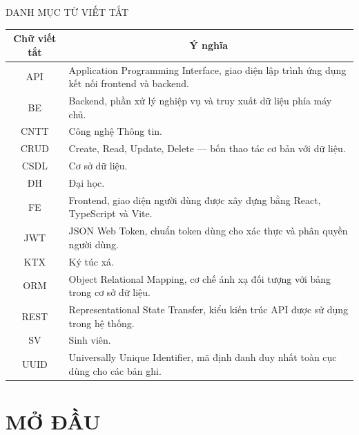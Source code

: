 \documentclass[12pt]{article}
\begin{document}
	\clearpage
	\listoffigures
	\clearpage
	\listoftables
	
	
	\newpage
	\begin{center}
		\fontsize{14pt}{17pt}\selectfont
		{DANH MỤC TỪ VIẾT TẮT}
	\end{center}
	
	\vspace{10pt}
	
	\begin{tabular}{|c|p{11cm}|}
        \hline
        {Chữ viết tắt} & \multicolumn{1}{c|}{\textbf{Ý nghĩa}} \\
        \hline
        API  & Application Programming Interface, giao diện lập trình ứng dụng kết nối frontend và backend. \\
        \hline
        BE   & Backend, phần xử lý nghiệp vụ và truy xuất dữ liệu phía máy chủ. \\
        \hline
        CNTT & Công nghệ Thông tin. \\
        \hline
        CRUD & Create, Read, Update, Delete — bốn thao tác cơ bản với dữ liệu. \\
        \hline
        CSDL & Cơ sở dữ liệu. \\
        \hline
        ĐH   & Đại học. \\
        \hline
        FE   & Frontend, giao diện người dùng được xây dựng bằng React, TypeScript và Vite. \\
        \hline
        JWT  & JSON Web Token, chuẩn token dùng cho xác thực và phân quyền người dùng. \\
        \hline
        KTX  & Ký túc xá. \\
        \hline
        ORM  & Object Relational Mapping, cơ chế ánh xạ đối tượng với bảng trong cơ sở dữ liệu. \\
        \hline
        REST & Representational State Transfer, kiểu kiến trúc API được sử dụng trong hệ thống. \\
        \hline
        SV   & Sinh viên. \\
        \hline
        UUID & Universally Unique Identifier, mã định danh duy nhất toàn cục dùng cho các bản ghi. \\
        \hline
\end{tabular}

\newpage
\section*{MỞ ĐẦU}
\end{document}
